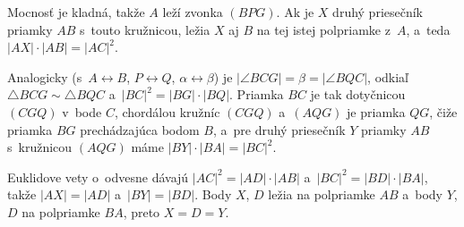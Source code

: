 {    Mocnosť je kladná, takže $A$ leží zvonka $(BPG)$. Ak je $X$ druhý priesečník priamky $AB$ s~touto kružnicou, ležia $X$ aj $B$ na tej istej polpriamke z~$A$, a~teda $|AX| \cdot |AB| = |AC|^2$.

    Analogicky (s~$A \leftrightarrow B$, $P \leftrightarrow Q$, $\alpha \leftrightarrow \beta$) je $|\angle BCG| = \beta = |\angle BQC|$, odkiaľ $\triangle BCG \sim \triangle BQC$ a~$|BC|^2 = |BG| \cdot |BQ|$. Priamka $BC$ je tak dotyčnicou $(CGQ)$ v~bode $C$, chordálou kružníc $(CGQ)$ a~$(AQG)$ je priamka $QG$, čiže priamka $BG$ prechádzajúca bodom $B$, a~pre druhý priesečník $Y$ priamky $AB$ s~kružnicou $(AQG)$ máme $|BY| \cdot |BA| = |BC|^2$.

    Euklidove vety o~odvesne dávajú $|AC|^2 = |AD| \cdot |AB|$ a~$|BC|^2 = |BD| \cdot |BA|$, takže $|AX| = |AD|$ a~$|BY| = |BD|$. Body $X$, $D$ ležia na polpriamke $AB$ a~body $Y$, $D$ na polpriamke $BA$, preto $X = D = Y$.
}

